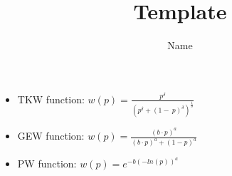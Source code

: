 \documentclass[11pt]{article}
\title{Template}
\author{Name}
\begin{document}
\maketitle

\begin{itemize}
    \item TKW function: $w(p)=\frac{p^{\delta}}{(p^{\delta}+(1-\ p)^{\delta})^{\frac{1}{\delta}}}$
    \item GEW function: $w(p)=\frac{(b\cdot{p})^{a}}{(b\cdot{p})^{a} + (1-p)^{a}}$
    \item PW function: $w(p)=e^{-b(-ln(p))^{a}}$
\end{itemize}
\end{document}
